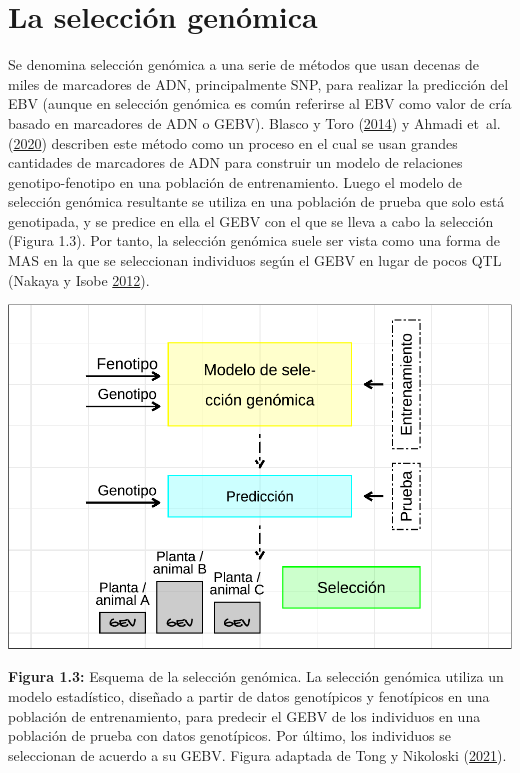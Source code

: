 \documentclass[11pt,spanish,a4paper,oneside,]{book} %
\begin{document}
\hypertarget{la-selecciuxf3n-genuxf3mica}{%
\section{La selección genómica}\label{la-selecciuxf3n-genuxf3mica}}

Se denomina selección genómica a una serie de métodos que usan decenas de miles de marcadores de ADN, principalmente SNP, para realizar la predicción del EBV (aunque en selección genómica es común referirse al EBV como valor de cría basado en marcadores de ADN o GEBV). Blasco y Toro (\protect\hyperlink{ref-cite:3}{2014}) y Ahmadi et~al. (\protect\hyperlink{ref-cite:33}{2020}) describen este método como un proceso en el cual se usan grandes cantidades de marcadores de ADN para construir un modelo de relaciones genotipo-fenotipo en una población de entrenamiento. Luego el modelo de selección genómica resultante se utiliza en una población de prueba que solo está genotipada, y se predice en ella el GEBV con el que se lleva a cabo la selección (Figura 1.3). Por tanto, la selección genómica suele ser vista como una forma de MAS en la que se seleccionan individuos según el GEBV en lugar de pocos QTL (Nakaya y Isobe \protect\hyperlink{ref-cite:6}{2012}).

\begin{center}\includegraphics[width=1\linewidth]{figures/GS} \end{center}

\begin{center}
\textbf{Figura 1.3:} Esquema de la selección genómica. La selección genómica utiliza un modelo estadístico, diseñado a partir de datos genotípicos y fenotípicos en una población de entrenamiento, para predecir el GEBV de los individuos en una población de prueba con datos genotípicos. Por último, los individuos se seleccionan de acuerdo a su GEBV. Figura adaptada de Tong y Nikoloski (\protect\hyperlink{ref-cite:7}{2021}).

\end{center}
\end{document}
